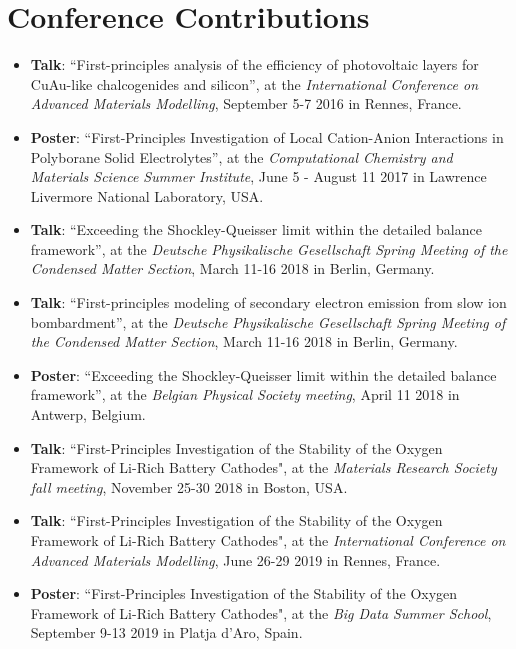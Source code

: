 \chapter*{Conference Contributions} \label{chapter:conferences}

\begin{itemize}

\item \textbf{Talk}: ``First-principles analysis of the efficiency of photovoltaic layers for CuAu-like chalcogenides and silicon'', at the \textit{International Conference on Advanced Materials Modelling}, September 5-7 2016 in Rennes, France.

\item \textbf{Poster}: ``First-Principles Investigation of Local Cation-Anion Interactions in Polyborane Solid Electrolytes'', at the \textit{Computational Chemistry and Materials Science Summer Institute}, June 5 - August 11 2017 in Lawrence Livermore National Laboratory, USA.

\item \textbf{Talk}: ``Exceeding the Shockley-Queisser limit within the detailed balance framework'', at the \textit{Deutsche Physikalische Gesellschaft Spring Meeting of the Condensed Matter Section}, March 11-16 2018 in Berlin, Germany.

\item \textbf{Talk}: ``First-principles modeling of secondary electron emission from slow ion bombardment'', at the \textit{Deutsche Physikalische Gesellschaft Spring Meeting of the Condensed Matter Section}, March 11-16 2018 in Berlin, Germany.

\item \textbf{Poster}: ``Exceeding the Shockley-Queisser limit within the detailed balance framework'', at the \textit{Belgian Physical Society meeting}, April 11 2018 in Antwerp, Belgium.

\item \textbf{Talk}: ``First-Principles Investigation of the Stability of the Oxygen Framework of Li-Rich Battery Cathodes", at the \textit{Materials Research Society fall meeting}, November 25-30 2018 in Boston, USA.

\item \textbf{Talk}: ``First-Principles Investigation of the Stability of the Oxygen Framework of Li-Rich Battery Cathodes", at the \textit{International Conference on Advanced Materials Modelling}, June 26-29 2019 in Rennes, France. 

\item \textbf{Poster}: ``First-Principles Investigation of the Stability of the Oxygen Framework of Li-Rich Battery Cathodes", at the \textit{Big Data Summer School}, September 9-13 2019 in Platja d'Aro, Spain.

\end{itemize}
